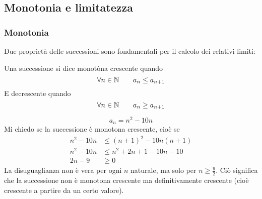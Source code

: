 \subsection{Monotonia e limitatezza}

\subsubsection{Monotonia}
Due proprietà delle successioni sono fondamentali per il calcolo dei relativi limiti:
\begin{defin}[Monotonia]
	Una successione si dice monotòna crescente quando
	\[
		\forall n\in\mathbb{N} \qquad a_n\leq a_{n+1}
	\]
	E decrescente quando
	\[
		\forall n\in\mathbb{N} \qquad a_n\geq a_{n+1}
	\]
\end{defin}
\begin{examp}
	\[
		a_n=n^2-10n
	\]
	Mi chiedo se la successione è monotona crescente, cioè se
	\begin{align*}
		n^2-10n & \leq(n+1)^2-10n(n+1) \\
		n^2-10n & \leq n^2+2n+1-10n-10 \\
		2n-9    & \geq0
	\end{align*}
	La disuguaglianza non è vera per ogni $n$ naturale, ma solo per $n\geq\frac{9}{2}$. Ciò significa che la successione non è monotona crescente ma definitivamente crescente (cioè crescente a partire da un certo valore).
\end{examp}

